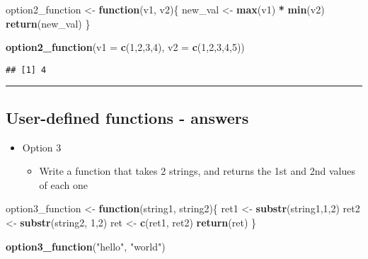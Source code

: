 \documentclass[]{article}
\newenvironment{Shaded}{\begin{snugshade}}{\end{snugshade}}
\newcommand{\ControlFlowTok}[1]{\textcolor[rgb]{0.13,0.29,0.53}{\textbf{#1}}}
\newcommand{\DataTypeTok}[1]{\textcolor[rgb]{0.13,0.29,0.53}{#1}}
\newcommand{\DecValTok}[1]{\textcolor[rgb]{0.00,0.00,0.81}{#1}}
\newcommand{\KeywordTok}[1]{\textcolor[rgb]{0.13,0.29,0.53}{\textbf{#1}}}
\newcommand{\NormalTok}[1]{#1}
\newcommand{\OperatorTok}[1]{\textcolor[rgb]{0.81,0.36,0.00}{\textbf{#1}}}
\newcommand{\StringTok}[1]{\textcolor[rgb]{0.31,0.60,0.02}{#1}}
\providecommand{\tightlist}{%
  \setlength{\itemsep}{0pt}\setlength{\parskip}{0pt}}
\begin{document}
\begin{Shaded}
\begin{Highlighting}[]
\NormalTok{option2_function <-}\StringTok{ }\ControlFlowTok{function}\NormalTok{(v1, v2)\{}
\NormalTok{  new_val <-}\StringTok{ }\KeywordTok{max}\NormalTok{(v1) }\OperatorTok{*}\StringTok{ }\KeywordTok{min}\NormalTok{(v2)}
  \KeywordTok{return}\NormalTok{(new_val)}
\NormalTok{\}}

\KeywordTok{option2_function}\NormalTok{(}\DataTypeTok{v1 =} \KeywordTok{c}\NormalTok{(}\DecValTok{1}\NormalTok{,}\DecValTok{2}\NormalTok{,}\DecValTok{3}\NormalTok{,}\DecValTok{4}\NormalTok{), }\DataTypeTok{v2 =} \KeywordTok{c}\NormalTok{(}\DecValTok{1}\NormalTok{,}\DecValTok{2}\NormalTok{,}\DecValTok{3}\NormalTok{,}\DecValTok{4}\NormalTok{,}\DecValTok{5}\NormalTok{))}
\end{Highlighting}
\end{Shaded}

\begin{verbatim}
## [1] 4
\end{verbatim}

\begin{center}\rule{0.5\linewidth}{\linethickness}\end{center}

\hypertarget{user-defined-functions---answers-2}{%
\subsection{User-defined functions -
answers}\label{user-defined-functions---answers-2}}

\begin{itemize}
\tightlist
\item
  Option 3

  \begin{itemize}
  \tightlist
  \item
    Write a function that takes 2 strings, and returns the 1st and 2nd
    values of each one
  \end{itemize}
\end{itemize}

\begin{Shaded}
\begin{Highlighting}[]
\NormalTok{option3_function <-}\StringTok{ }\ControlFlowTok{function}\NormalTok{(string1, string2)\{}
\NormalTok{  ret1 <-}\StringTok{ }\KeywordTok{substr}\NormalTok{(string1,}\DecValTok{1}\NormalTok{,}\DecValTok{2}\NormalTok{)}
\NormalTok{  ret2 <-}\StringTok{ }\KeywordTok{substr}\NormalTok{(string2, }\DecValTok{1}\NormalTok{,}\DecValTok{2}\NormalTok{)}
\NormalTok{  ret <-}\StringTok{ }\KeywordTok{c}\NormalTok{(ret1, ret2)}
  \KeywordTok{return}\NormalTok{(ret)}
\NormalTok{\}}

\KeywordTok{option3_function}\NormalTok{(}\StringTok{"hello"}\NormalTok{, }\StringTok{"world"}\NormalTok{)}
\end{Highlighting}
\end{Shaded}
\end{document}
